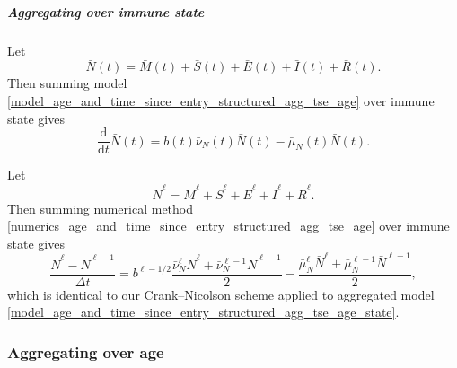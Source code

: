 \documentclass[USenglish]{article}
\newcommand{\md}{\mathrm{d}}
\begin{document}
\subparagraph{Aggregating over immune state}

Let
\begin{equation}
  \bar{N}(t)
  = \bar{M}(t) + \bar{S}(t) + \bar{E}(t)
  + \bar{I}(t) + \bar{R}(t).
\end{equation}
Then summing model
\eqref{model_age_and_time_since_entry_structured_agg_tse_age} over
immune state gives
\begin{equation}
  \label{model_age_and_time_since_entry_structured_agg_tse_age_state}
  \frac{\md}{\md t} \bar{N}(t)
  = b(t) \bar{\nu}_N(t) \bar{N}(t)
  - \bar{\mu}_N(t) \bar{N}(t).
\end{equation}

Let
\begin{equation}
  \bar{N}^{\ell}
  = \bar{M}^{\ell} + \bar{S}^{\ell} + \bar{E}^{\ell}
  + \bar{I}^{\ell} + \bar{R}^{\ell}.
\end{equation}
Then summing numerical method
\eqref{numerics_age_and_time_since_entry_structured_agg_tse_age} over
immune state gives
\begin{equation}
  \label{numerics_age_and_time_since_entry_structured_agg_tse_age_state}
  \frac{\bar{N}^{\ell} - \bar{N}^{\ell - 1}}{\Delta t}
  = b^{\ell - 1 / 2}
  \frac{\bar{\nu}_N^{\ell} \bar{N}^{\ell}
    + \bar{\nu}_N^{\ell - 1} \bar{N}^{\ell - 1}}{2}
  - \frac{\bar{\mu}_N^{\ell} \bar{N}^{\ell}
    + \bar{\mu}_N^{\ell - 1} \bar{N}^{\ell - 1}}{2},
\end{equation}
which is identical to our Crank--Nicolson scheme applied to aggregated
model
\eqref{model_age_and_time_since_entry_structured_agg_tse_age_state}.


\subsubsection{Aggregating over age}
\end{document}
